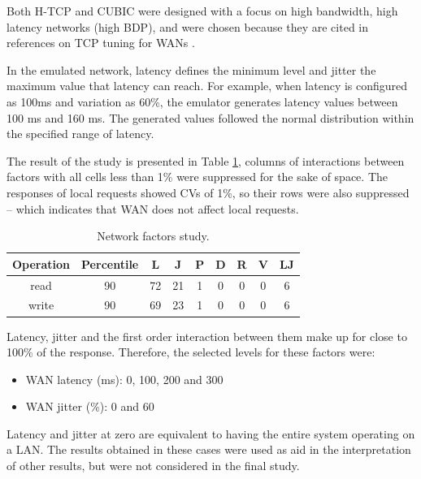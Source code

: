 \documentclass[doublespacing]{bmcart}
\begin{document}
Both H-TCP and CUBIC were designed with a focus on high bandwidth, high latency
networks (high BDP), and were chosen because they are cited in references on TCP
tuning for WANs \cite{ESnet2012}.

In the emulated network, latency defines the minimum level and jitter the maximum
value that latency can reach. For example, when latency is configured as 100ms and variation
as 60\%, the emulator generates latency values between 100 ms and 160 ms. The
generated values followed the normal distribution within the specified range of
latency.

The result of the study is presented in Table
\ref{tab:estudo_para_fatores_de_rede}, columns of interactions between factors
with all cells less than 1\% were suppressed for the sake of space. The
responses of local requests showed CVs of 1\%, so their rows were also
suppressed -- which indicates that WAN does not affect local requests.

\begin{table}[h!] 
\caption{Network factors study.} \label{tab:estudo_para_fatores_de_rede}
\begin{tabular}{ccccccccc} \hline

Operation & Percentile & L & J & P & D & R & V & LJ\\\hline

read & 90 & 72 & 21 & 1 & 0 & 0 & 0 & 6\\

write & 90 & 69 & 23 & 1 & 0 & 0 & 0 & 6\\\hline

\end{tabular}

\end{table}

Latency, jitter and the first order interaction between them make up for close to 100\% of the response. Therefore, the selected levels for
these factors were:

\begin{itemize}

\item WAN latency (ms): 0, 100, 200 and 300

\item WAN jitter (\%): 0 and 60

\end{itemize}

Latency and jitter at zero are equivalent to having the entire system operating
on a LAN. The results obtained in these cases were used as aid in the
interpretation of other results, but were not considered in the final study.
\end{document}
